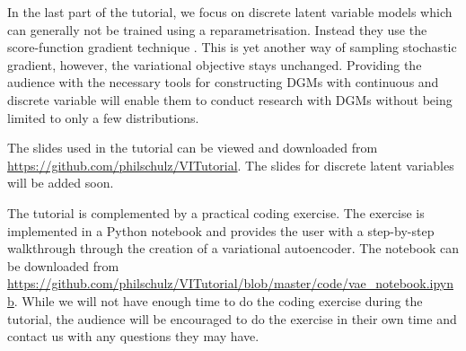 In the last part of the tutorial, we focus on discrete latent variable models which can generally
not be trained using a reparametrisation. Instead they use the score-function gradient technique
\citep{Williams:1992, PaisleyEtAl:2012}.
This is yet another way of sampling stochastic gradient, however, the variational objective stays
unchanged. Providing the audience with the necessary tools for constructing DGMs with continuous
and discrete variable will enable them to conduct research with DGMs without being limited
to only a few distributions.

The slides used in the tutorial can be viewed and downloaded from \url{https://github.com/philschulz/VITutorial}. The slides for discrete latent variables will be added soon.

The tutorial is complemented by a practical coding exercise. 
The exercise is implemented
in a Python notebook and provides the user with a step-by-step walkthrough through the 
creation of a variational autoencoder. The notebook can be downloaded
from \url{https://github.com/philschulz/VITutorial/blob/master/code/vae_notebook.ipynb}.
While we will not have enough
time to do the coding exercise during the tutorial, the audience will be encouraged to do the
exercise in their own time and contact us with any questions they may have.